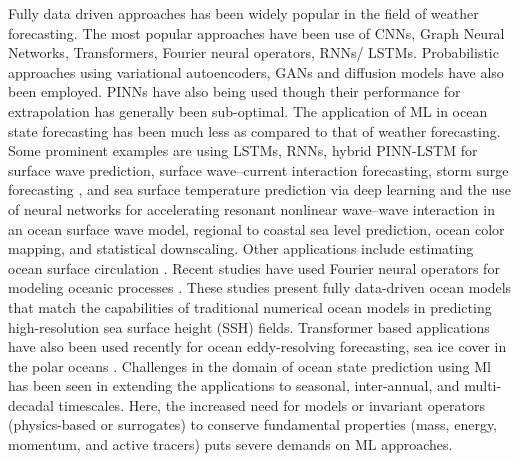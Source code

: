 \documentclass{article}
\begin{document}
Fully data driven approaches has been widely popular in the field of weather forecasting. The most popular approaches have been use of CNNs, Graph Neural Networks, Transformers, Fourier neural operators, RNNs/ LSTMs. Probabilistic approaches using variational autoencoders, GANs and diffusion models have also been employed. PINNs have also being used though their performance for extrapolation has generally been sub-optimal. The application of ML in ocean state forecasting has been much less as compared to that of weather forecasting. Some prominent examples are using LSTMs, RNNs, hybrid PINN-LSTM  \citep{minuzzi2023deep, lawal2025optimizing} for surface wave prediction,  surface wave–current interaction forecasting, storm surge forecasting \citep{xie2023developing}, and sea surface temperature prediction via deep learning \citep{wolff2020statistical, xu2023deep} and the use of neural networks for accelerating resonant nonlinear wave–wave interaction in an ocean surface wave model, regional to coastal sea level prediction, ocean color mapping, and statistical downscaling. Other applications include estimating ocean surface circulation \citep{sinha2021estimating, subel2024building}.  Recent studies have used  Fourier neural operators for modeling oceanic processes \citep{bire2023ocean, chattopadhyay2024oceannet, sun2024streamlining}. These studies present fully data-driven ocean models that
match the capabilities of traditional numerical ocean models in predicting high-resolution sea surface height (SSH) fields.  Transformer based applications have also been used recently for ocean eddy-resolving forecasting,  sea ice cover
in the polar oceans \citep{wang2024xihe, andersson2021seasonal}. Challenges in the domain of ocean state prediction using Ml has been seen in extending the applications to seasonal, inter-annual, and multi-decadal timescales. Here, the increased need for models or invariant operators (physics-based or surrogates) to conserve fundamental properties (mass, energy, momentum, and active tracers) puts severe demands on ML approaches.
\end{document}
